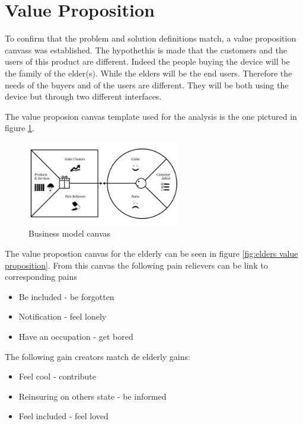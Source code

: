 \section{Value Proposition}
To confirm that the problem and solution definitions match, a value proposition canvass was established.
The hypothethis is made that the customers and the users of this product are different. Indeed the people buying the device will be the family of the elder(s). While the elders will be the end users. Therefore the needs of the buyers and of the users are different. They will be both using the device but through two different interfaces.

The value proposion canvas template used for the analysis is the one pictured in figure \ref{fig:vpcanvas}.

\begin{figure}[!htb]
    \centering
    \includegraphics[width=0.6\textwidth,keepaspectratio]{chap/marketFig/vpcanvas.jpg}
    \caption{Business model canvas}
    \label{fig:vpcanvas}
\end{figure}

The value propostion canvas for the elderly can be seen in figure \ref{fig:elders value proposition}. From this canvas the following pain relievers can be link to corresponding pains
\begin{itemize}
  \item{Be included - be forgotten}
  \item{Notification - feel lonely}
  \item{Have an occupation - get bored}
\end{itemize}

The following gain creators match de elderly gains:
\begin{itemize}
  \item{Feel cool - contribute}
  \item{Reinsuring on others state - be informed}
  \item{Feel included - feel loved}
\end{itemize}

